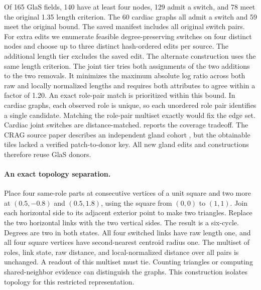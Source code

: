 Of 165 GlaS fields, 140 have at least four nodes, 129 admit a switch, and 78 meet the original 1.35 length criterion. The 60 cardiac graphs all admit a switch and 59 meet the original bound. The saved manifest includes all original switch pairs. For extra edits we enumerate feasible degree-preserving switches on four distinct nodes and choose up to three distinct hash-ordered edits per source. The additional length tier excludes the saved edit. The alternate construction uses the same length criterion. The joint tier tries both assignments of the two additions to the two removals. It minimizes the maximum absolute log ratio across both raw and locally normalized lengths and requires both attributes to agree within a factor of 1.20. An exact role-pair match is prioritized within this bound. In cardiac graphs, each observed role is unique, so each unordered role pair identifies a single candidate. Matching the role-pair multiset exactly would fix the edge set. Cardiac joint switches are distance-matched.  reports the coverage tradeoff. The CRAG source paper describes an independent gland cohort \cite{graham2019mild}, but the obtainable tiles lacked a verified patch-to-donor key. All new gland edits and constructions therefore reuse GlaS donors.

\begin{table}[t]
\centering
\caption{Coverage, balance, and sensitivity to matching. D/F/E gives donors, fields or scans, and edits. Raw and local columns give the median and maximum multiplicative imbalance under the \emph{same} correspondence. The original length criterion uses separately sorted raw lengths, so its maximum under the common correspondence can exceed 1.35. Roles counts exact role-pair matches. Gains are against typed centroid distance. Rank minus response compares the GNN's edited-state loss AUROC with its matched absolute probability-change AUROC. Paired intervals are in points.}
\label{tab:balance}
\scriptsize
\setlength{\tabcolsep}{3.5pt}

\end{table}

\paragraph{An exact topology separation.}
Place four same-role parts at consecutive vertices of a unit square and two more at $(0.5,-0.8)$ and $(0.5,1.8)$, using the square from $(0,0)$ to $(1,1)$. Join each horizontal side to its adjacent exterior point to make two triangles. Replace the two horizontal links with the two vertical sides. The result is a six-cycle. Degrees are two in both states. All four switched links have raw length one, and all four square vertices have second-nearest centroid radius one. The multiset of roles, link state, raw distance, and local-normalized distance over all pairs is unchanged. A readout of this multiset must tie. Counting triangles or computing shared-neighbor evidence can distinguish the graphs. This construction isolates topology for this restricted representation.

